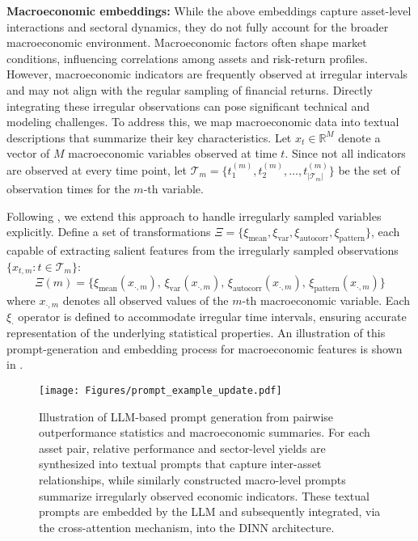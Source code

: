 \textbf{Macroeconomic embeddings:} While the above embeddings capture asset-level interactions and sectoral dynamics, they do not fully account for the broader macroeconomic environment. Macroeconomic factors often shape market conditions, influencing correlations among assets and risk-return profiles. However, macroeconomic indicators are frequently observed at irregular intervals and may not align with the regular sampling of financial returns. Directly integrating these irregular observations can pose significant technical and modeling challenges.
To address this, we map macroeconomic data into textual descriptions that summarize their key characteristics. Let $x_{t} \in \mathbb{R}^{M}$ denote a vector of $M$ macroeconomic variables observed at time $t$. Since not all indicators are observed at every time point, let $\mathcal{T}_{m}=\{t_{1}^{(m)}, t_{2}^{(m)},\ldots,t_{|\mathcal{T}_{m}|}^{(m)}\}$ be the set of observation times for the $m$-th variable.

Following \citep{jin2023time}, we extend this approach to handle irregularly sampled variables explicitly. Define a set of transformations $\Xi=\{\xi_{\text{mean}},\xi_{\text{var}},\xi_{\text{autocorr}},\xi_{\text{pattern}}\}$, each capable of extracting salient features from the irregularly sampled observations $\{x_{t,m} : t \in \mathcal{T}_{m}\}$: 
\begin{equation}
    \Xi(m)=\{\xi_{\text{mean}}(x_{\cdot,m}),\,\xi_{\text{var}}(x_{\cdot,m}),\,\xi_{\text{autocorr}}(x_{\cdot,m}),\,\xi_{\text{pattern}}(x_{\cdot,m})\}
\end{equation}
where $x_{\cdot,m}$ denotes all observed values of the $m$-th macroeconomic variable. Each $\xi_{\cdot}$ operator is defined to accommodate irregular time intervals, ensuring accurate representation of the underlying statistical properties. An illustration of this prompt-generation and embedding process for macroeconomic features is shown in .

\begin{figure}[h!] %
  \centering
  \texttt{[image: Figures/prompt\_example\_update.pdf]}%
   \captionsetup{font=footnotesize}
   \caption{Illustration of LLM-based prompt generation from pairwise outperformance statistics and macroeconomic summaries. For each asset pair, relative performance and sector-level yields are synthesized into textual prompts that capture inter-asset relationships, while similarly constructed macro-level prompts summarize irregularly observed economic indicators. These textual prompts are embedded by the LLM and subsequently integrated, via the cross-attention mechanism, into the DINN architecture.}
  \label{fig:prompt}
\end{figure}


